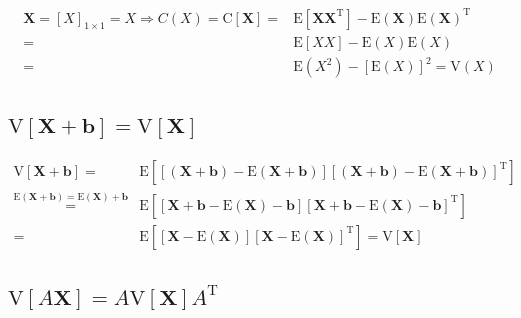 \documentclass[
]{book}
\theoremstyle{definition}
\theoremstyle{definition}
\theoremstyle{definition}
\theoremstyle{definition}
\theoremstyle{remark}
\begin{document}
\begin{align*}
\boldsymbol{X}=\left[X\right]_{1\times1}=X\Rightarrow C\left(X\right)=\mathrm{C}\left[\boldsymbol{X}\right]= & \mathrm{E}\left[\boldsymbol{X}\boldsymbol{X}^{\mathrm{T}}\right]-\mathrm{E}\left(\boldsymbol{X}\right)\mathrm{E}\left(\boldsymbol{X}\right)^{\mathrm{T}}\\
= & \mathrm{E}\left[XX\right]-\mathrm{E}\left(X\right)\mathrm{E}\left(X\right)\\
= & \mathrm{E}\left(X^{2}\right)-\left[\mathrm{E}\left(X\right)\right]^{2}=\mathrm{V}\left(X\right)
\end{align*}

\hypertarget{mathrmvleftboldsymbolxboldsymbolbrightmathrmvleftboldsymbolxright}{%
\subsection{\texorpdfstring{\(\mathrm{V}\left[\boldsymbol{X}+\boldsymbol{b}\right]=\mathrm{V}\left[\boldsymbol{X}\right]\)}{\textbackslash mathrm\{V\}\textbackslash left{[}\textbackslash boldsymbol\{X\}+\textbackslash boldsymbol\{b\}\textbackslash right{]}=\textbackslash mathrm\{V\}\textbackslash left{[}\textbackslash boldsymbol\{X\}\textbackslash right{]}}}\label{mathrmvleftboldsymbolxboldsymbolbrightmathrmvleftboldsymbolxright}}

\begin{align*}
\mathrm{V}\left[\boldsymbol{X}+\boldsymbol{b}\right]= & \mathrm{E}\left[\left[\left(\boldsymbol{X}+\boldsymbol{b}\right)-\mathrm{E}\left(\boldsymbol{X}+\boldsymbol{b}\right)\right]\left[\left(\boldsymbol{X}+\boldsymbol{b}\right)-\mathrm{E}\left(\boldsymbol{X}+\boldsymbol{b}\right)\right]^{\mathrm{T}}\right]\\
\overset{\mathrm{E}\left(\boldsymbol{X}+\boldsymbol{b}\right)=\mathrm{E}\left(\boldsymbol{X}\right)+\boldsymbol{b}}{=} & \mathrm{E}\left[\left[\boldsymbol{X}+\boldsymbol{b}-\mathrm{E}\left(\boldsymbol{X}\right)-\boldsymbol{b}\right]\left[\boldsymbol{X}+\boldsymbol{b}-\mathrm{E}\left(\boldsymbol{X}\right)-\boldsymbol{b}\right]^{\mathrm{T}}\right]\\
= & \mathrm{E}\left[\left[\boldsymbol{X}-\mathrm{E}\left(\boldsymbol{X}\right)\right]\left[\boldsymbol{X}-\mathrm{E}\left(\boldsymbol{X}\right)\right]^{\mathrm{T}}\right]=\mathrm{V}\left[\boldsymbol{X}\right]
\end{align*}

\hypertarget{mathrmvleftaboldsymbolxrightamathrmvleftboldsymbolxrightamathrmt}{%
\subsection{\texorpdfstring{\(\mathrm{V}\left[A\boldsymbol{X}\right]=A\mathrm{V}\left[\boldsymbol{X}\right]A^{\mathrm{T}}\)}{\textbackslash mathrm\{V\}\textbackslash left{[}A\textbackslash boldsymbol\{X\}\textbackslash right{]}=A\textbackslash mathrm\{V\}\textbackslash left{[}\textbackslash boldsymbol\{X\}\textbackslash right{]}A\^{}\{\textbackslash mathrm\{T\}\}}}\label{mathrmvleftaboldsymbolxrightamathrmvleftboldsymbolxrightamathrmt}}
\end{document}
